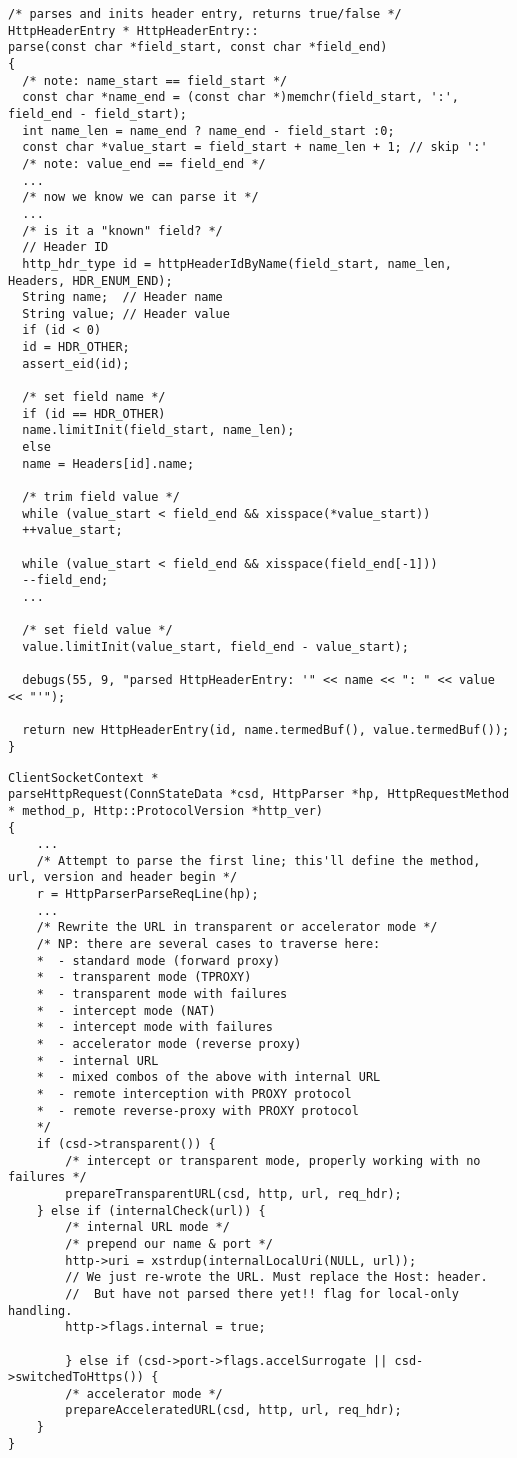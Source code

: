 \begin{lstlisting}[title= squid/src/HttpHeader.cc line:1620]
/* parses and inits header entry, returns true/false */
HttpHeaderEntry * HttpHeaderEntry::
parse(const char *field_start, const char *field_end)
{
  /* note: name_start == field_start */
  const char *name_end = (const char *)memchr(field_start, ':', field_end - field_start);
  int name_len = name_end ? name_end - field_start :0;
  const char *value_start = field_start + name_len + 1; // skip ':' 
  /* note: value_end == field_end */
  ...
  /* now we know we can parse it */
  ...
  /* is it a "known" field? */
  // Header ID
  http_hdr_type id = httpHeaderIdByName(field_start, name_len, Headers, HDR_ENUM_END);
  String name;  // Header name
  String value; // Header value
  if (id < 0)
  id = HDR_OTHER;
  assert_eid(id);
  
  /* set field name */
  if (id == HDR_OTHER)
  name.limitInit(field_start, name_len);
  else
  name = Headers[id].name;
  
  /* trim field value */
  while (value_start < field_end && xisspace(*value_start))
  ++value_start;
  
  while (value_start < field_end && xisspace(field_end[-1]))
  --field_end;
  ...

  /* set field value */
  value.limitInit(value_start, field_end - value_start);
  
  debugs(55, 9, "parsed HttpHeaderEntry: '" << name << ": " << value << "'");
  
  return new HttpHeaderEntry(id, name.termedBuf(), value.termedBuf());
}
\end{lstlisting}

\begin{lstlisting}[title=squid/src/client\_side.cc line:2152]
ClientSocketContext *
parseHttpRequest(ConnStateData *csd, HttpParser *hp, HttpRequestMethod * method_p, Http::ProtocolVersion *http_ver)
{
	...
	/* Attempt to parse the first line; this'll define the method, url, version and header begin */
	r = HttpParserParseReqLine(hp);
	...
	/* Rewrite the URL in transparent or accelerator mode */
	/* NP: there are several cases to traverse here:
	*  - standard mode (forward proxy)
	*  - transparent mode (TPROXY)
	*  - transparent mode with failures
	*  - intercept mode (NAT)
	*  - intercept mode with failures
	*  - accelerator mode (reverse proxy)
	*  - internal URL
	*  - mixed combos of the above with internal URL
	*  - remote interception with PROXY protocol
	*  - remote reverse-proxy with PROXY protocol
	*/
	if (csd->transparent()) {
		/* intercept or transparent mode, properly working with no failures */
		prepareTransparentURL(csd, http, url, req_hdr);
	} else if (internalCheck(url)) {
		/* internal URL mode */
		/* prepend our name & port */
		http->uri = xstrdup(internalLocalUri(NULL, url));
		// We just re-wrote the URL. Must replace the Host: header.
		//  But have not parsed there yet!! flag for local-only handling.
		http->flags.internal = true;
	
		} else if (csd->port->flags.accelSurrogate || csd->switchedToHttps()) {
		/* accelerator mode */
		prepareAcceleratedURL(csd, http, url, req_hdr);
	}
}
\end{lstlisting}





